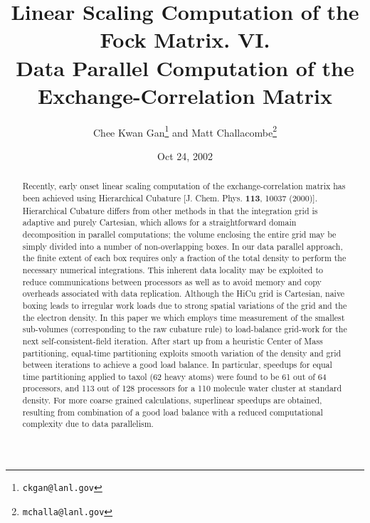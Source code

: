 \commentoutA{\documentclass[prb,aps,twocolumn,twocolumngrid]{revtex4}}
\begin{document}
\title[Short Title]{ Linear Scaling Computation of the Fock
Matrix. VI. \\ Data Parallel Computation of the Exchange-Correlation
Matrix }

\author{Chee Kwan Gan\footnote{{\tt ckgan@lanl.gov}} and Matt
Challacombe\footnote{{\tt mchalla@lanl.gov}}}
 

\date{Oct 24, 2002}

\begin{abstract}
Recently, early onset linear scaling computation of the
exchange-correlation matrix has been achieved using Hierarchical Cubature 
[J. Chem. Phys. {\bf 113}, 10037 (2000)]. Hierarchical Cubature differs from other 
methods in that the integration grid is adaptive and purely Cartesian, 
which allows for a straightforward domain decomposition in 
parallel computations; the volume enclosing the entire grid may be simply
divided into a number of non-overlapping boxes. In our data parallel approach, the 
finite extent of each box requires only a fraction of the total density to perform the necessary 
numerical integrations.  This inherent data locality may be exploited to reduce communications 
between processors as well as to avoid memory and copy overheads associated with data replication.  
Although the HiCu grid is Cartesian, naive boxing leads to
irregular work loads due to strong spatial variations of the grid and the
the electron density.  In this paper we
which employs time measurement of the smallest sub-volumes (corresponding to the raw 
cubature rule) to load-balance  grid-work for the next self-consistent-field iteration.
After start up from a heuristic Center of Mass  partitioning,
equal-time partitioning exploits smooth variation of the density and grid between 
iterations  to achieve a good load balance. In particular, speedups for equal time 
partitioning applied to taxol (62 heavy atoms) were found to be 61 out of 64 processors, 
and 113 out of 128 processors for a 110 molecule water cluster at standard density.  
For more coarse grained calculations, superlinear speedups are obtained, resulting from 
combination of a good load balance with a reduced computational complexity due to data parallelism.
\end{abstract}
\end{document}
